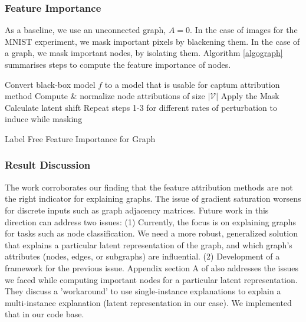 \vspace{-3mm}
\subsubsection{Feature Importance}
As a baseline, we use an unconnected graph, $A=0$. In the case of images for the MNIST experiment, we mask important pixels by blackening them. In the case of a graph, we mask important nodes, by isolating them. Algorithm \ref{algograph} summarises steps to compute the feature importance of nodes. 

\begin{algorithm}
  Convert black-box model $f$ to a model that is usable for captum attribution method \citep{captumaigraph} \;
  Compute \& normalize node attributions of size $|\mathcal{V}|$  \;
  Apply the Mask \;
  Calculate latent shift \;
  Repeat steps 1-3 for different rates of perturbation to induce while masking \;
  \caption{Label Free Feature Importance for Graph}
  \label{algograph}
\end{algorithm}


\subsubsection{Result Discussion}The work \citep{gnnpaper} corroborates our finding that the feature attribution methods are not the right indicator for explaining graphs. The issue of gradient saturation worsens for discrete inputs such as graph adjacency matrices. Future work in this direction can address two issues: (1) Currently, the focus is on explaining graphs for tasks such as node classification. We need a more robust, generalized solution that explains a particular latent representation of the graph, and which graph's attributes (nodes, edges, or subgraphs) are influential. (2) Development of a framework for the previous issue. Appendix section A of \citep{gnnpaper} also addresses the issues we faced while computing important nodes for a particular latent representation. They discuss a 'workaround' to use single-instance explanations to explain a multi-instance explanation (latent representation in our case).  We implemented that in our code base. 


